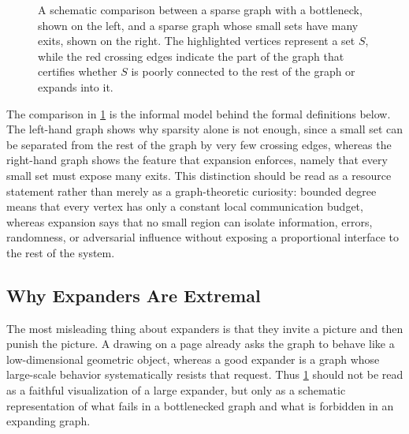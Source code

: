 \begin{figure}[t]
\begin{mdframed}[linewidth=0.4pt, linecolor=expanderMutedColor!45, backgroundcolor=white, roundcorner=2pt, innerleftmargin=6pt, innerrightmargin=6pt, innertopmargin=6pt, innerbottommargin=6pt]
{%
		}
	\end{mdframed}
	\caption{A schematic comparison between a sparse graph with a bottleneck, shown on the left, and a sparse graph whose small sets have many exits, shown on the right. The highlighted vertices represent a set \(S\), while the red crossing edges indicate the part of the graph that certifies whether \(S\) is poorly connected to the rest of the graph or expands into it.}
	\label{fig:expansion-versus-bottleneck}
\end{figure}

The comparison in \cref{fig:expansion-versus-bottleneck} is the informal model behind the formal definitions below. The left-hand graph shows why sparsity alone is not enough, since a small set can be separated from the rest of the graph by very few crossing edges, whereas the right-hand graph shows the feature that expansion enforces, namely that every small set must expose many exits. This distinction should be read as a resource statement rather than merely as a graph-theoretic curiosity: bounded degree means that every vertex has only a constant local communication budget, whereas expansion says that no small region can isolate information, errors, randomness, or adversarial influence without exposing a proportional interface to the rest of the system.

\subsection{Why Expanders Are Extremal}
\label{subsec:why-expanders-are-extremal}

The most misleading thing about expanders is that they invite a picture and then punish the picture. A drawing on a page already asks the graph to behave like a low-dimensional geometric object, whereas a good expander is a graph whose large-scale behavior systematically resists that request. Thus \cref{fig:expansion-versus-bottleneck} should not be read as a faithful visualization of a large expander, but only as a schematic representation of what fails in a bottlenecked graph and what is forbidden in an expanding graph.

